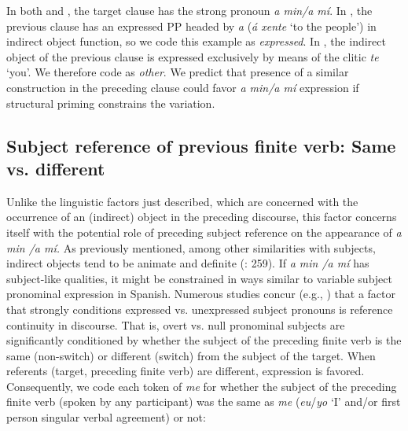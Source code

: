 \documentclass[output=paper]{langscibook}
\begin{document}
In both  and , the target clause has the strong pronoun \textit{a min\slash a mí}. In , the previous clause has an expressed PP headed by \textit{a} (\textit{á xente} ‘to the people’) in indirect object function, so we code this example as \textit{expressed}. In , the indirect object of the previous clause is expressed exclusively by means of the clitic \textit{te} ‘you’. We therefore code  as \textit{other}. We predict that presence of a similar construction in the preceding clause could favor \textit{a min\slash a mí} expression if structural priming constrains the variation.


\subsection{Subject reference of previous finite verb: Same vs. different}
Unlike the linguistic factors just described, which are concerned with the occurrence of an (indirect) object in the preceding discourse, this factor concerns itself with the potential role of preceding subject reference on the appearance of \textit{a min /a mí.} As previously mentioned, among other similarities with subjects, indirect objects tend to be animate and definite (\citealt{HopperThompson1980}: 259). If \textit{a min /a mí} has subject-like qualities, it might be constrained in ways similar to variable subject pronominal expression in Spanish. Numerous studies concur (e.g., \citealt{CarvalhoShin2015}) that a factor that strongly conditions expressed vs. unexpressed subject pronouns is reference continuity in discourse. That is, overt vs. null pronominal subjects are significantly conditioned by whether the subject of the preceding finite verb is the same (non-switch) or different (switch) from the subject of the target. When referents (target, preceding finite verb) are different, expression is favored. Consequently, we code each token of \textit{me} for whether the subject of the preceding finite verb (spoken by any participant) was the same as \textit{me} (\textit{eu}/\textit{yo} ‘I’ and/or first person singular verbal agreement) or not: 
\end{document}
